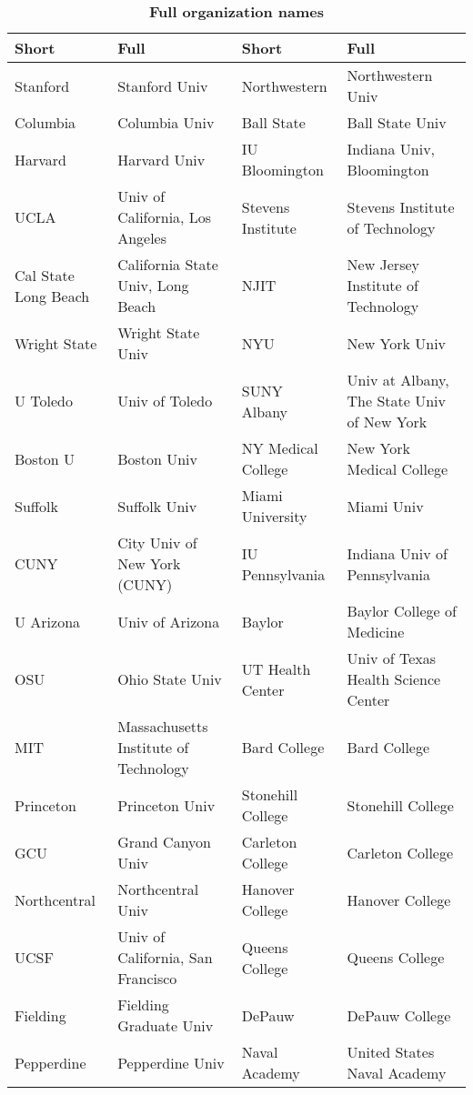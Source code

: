 \documentclass[12pt]{article} %
\begin{document}
\begin{table}[ht]
\centering
\caption{\textbf{Full organization names}}
\label{table:supp:orglabels}
\begin{adjustwidth}{-2cm}{}
\begingroup\scriptsize
\begin{tabular}{llll}
  \hline
Short & Full & Short & Full \\ 
  \hline
Stanford & Stanford Univ & Northwestern & Northwestern Univ \\ 
  Columbia & Columbia Univ & Ball State & Ball State Univ \\ 
  Harvard & Harvard Univ & IU Bloomington & Indiana Univ, Bloomington \\ 
  UCLA & Univ of California, Los Angeles & Stevens Institute & Stevens Institute of Technology \\ 
  Cal State Long Beach & California State Univ, Long Beach & NJIT & New Jersey Institute of Technology \\ 
  Wright State & Wright State Univ & NYU & New York Univ \\ 
  U Toledo & Univ of Toledo & SUNY Albany & Univ at Albany, The State Univ of New York \\ 
  Boston U & Boston Univ & NY Medical College & New York Medical College \\ 
  Suffolk & Suffolk Univ & Miami University & Miami Univ \\ 
  CUNY & City Univ of New York (CUNY) & IU Pennsylvania & Indiana Univ of Pennsylvania \\ 
  U Arizona & Univ of Arizona & Baylor & Baylor College of Medicine \\ 
  OSU & Ohio State Univ & UT Health Center & Univ of Texas Health Science Center \\ 
  MIT & Massachusetts Institute of Technology & Bard College & Bard College \\ 
  Princeton & Princeton Univ & Stonehill College & Stonehill College \\ 
  GCU & Grand Canyon Univ & Carleton College & Carleton College \\ 
  Northcentral & Northcentral Univ & Hanover College & Hanover College \\ 
  UCSF & Univ of California, San Francisco & Queens College & Queens College \\ 
  Fielding & Fielding Graduate Univ & DePauw & DePauw College \\ 
  Pepperdine & Pepperdine Univ & Naval Academy & United States Naval Academy \\ 

\end{tabular}
\end{adjustwidth}
\end{table}
\end{document}
